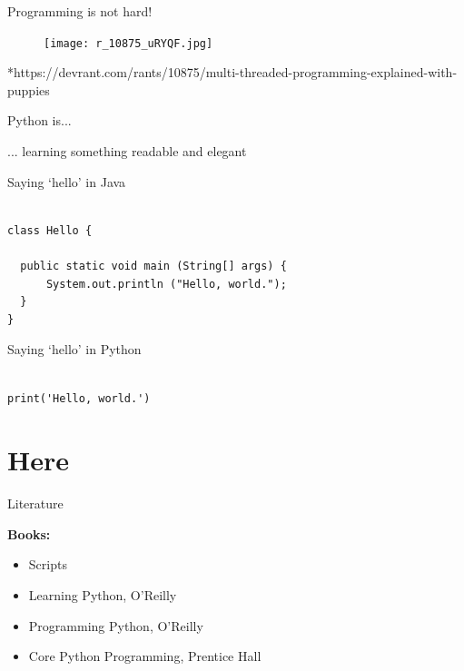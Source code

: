 \documentclass[notes=hide]{beamer}
\begin{document}
\begin{frame}[fragile]{Programming is not hard!}

\begin{figure}[h!]
\centering
\texttt{[image: r\_10875\_uRYQF.jpg]}
\end{figure} 
*https://devrant.com/rants/10875/multi-threaded-programming-explained-with-puppies

\end{frame}

        
       
\begin{frame}[fragile]{Python is...}
  
   ...  learning something readable and elegant
 
 \begin{block}{Saying `hello' in Java} 
 \begin{verbatim}

class Hello {

  public static void main (String[] args) {
      System.out.println ("Hello, world.");
  }
}  
\end{verbatim}
  \end{block}

 \begin{block}{Saying `hello' in Python } 
 \begin{verbatim}

print('Hello, world.')

\end{verbatim}

  \end{block}
\end{frame}

\section{Here}

\begin{frame}{Literature}

  {\bf Books:}
  \begin{itemize}
    \item Scripts
    \item Learning Python, O'Reilly \cite{Lutz:2007:LP}
    \item Programming Python, O'Reilly \cite{Lutz:2006:PP}
    \item Core Python Programming, Prentice Hall \cite{Chun:2007:CPP}
  \end{itemize}

\end{frame}
\end{document}
